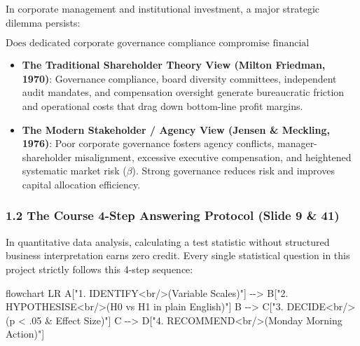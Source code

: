 \documentclass[
]{article}
\newenvironment{Shaded}{}{}
\newcommand{\NormalTok}[1]{#1}
\providecommand{\tightlist}{%
  \setlength{\itemsep}{0pt}\setlength{\parskip}{0pt}}
\begin{document}
In corporate management and institutional investment, a major strategic
dilemma persists:

\[\text{Does dedicated corporate governance compliance compromise financial profitability, or does it confer a resilience and performance premium?}\]

\begin{itemize}
\tightlist
\item
  \textbf{The Traditional Shareholder Theory View (Milton Friedman,
  1970)}: Governance compliance, board diversity committees, independent
  audit mandates, and compensation oversight generate bureaucratic
  friction and operational costs that drag down bottom-line profit
  margins.
\item
  \textbf{The Modern Stakeholder / Agency View (Jensen \& Meckling,
  1976)}: Poor corporate governance fosters agency conflicts,
  manager-shareholder misalignment, excessive executive compensation,
  and heightened systematic market risk (\(\beta\)). Strong governance
  reduces risk and improves capital allocation efficiency.
\end{itemize}

\subsubsection{1.2 The Course 4-Step Answering Protocol (Slide 9 \&
41)}\label{the-course-4-step-answering-protocol-slide-9-41}

In quantitative data analysis, calculating a test statistic without
structured business interpretation earns zero credit. Every single
statistical question in this project strictly follows this 4-step
sequence:

\begin{Shaded}
\begin{Highlighting}[]
\NormalTok{flowchart LR}
\NormalTok{    A["1. IDENTIFY\textless{}br/\textgreater{}(Variable Scales)"] {-}{-}\textgreater{} B["2. HYPOTHESISE\textless{}br/\textgreater{}(H0 vs H1 in plain English)"]}
\NormalTok{    B {-}{-}\textgreater{} C["3. DECIDE\textless{}br/\textgreater{}(p \textless{} .05 \& Effect Size)"]}
\NormalTok{    C {-}{-}\textgreater{} D["4. RECOMMEND\textless{}br/\textgreater{}(Monday Morning Action)"]}
\end{Highlighting}
\end{Shaded}
\end{document}
